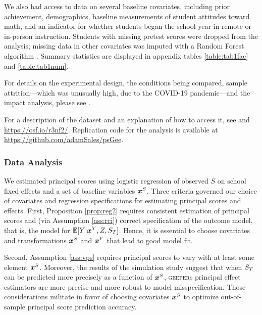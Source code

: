 \documentclass[]{article}
\begin{document}
We also had access to data on several baseline covariates, including prior achievement, demographics, baseline measurements of student attitudes toward math, and an indicator for whether students began the school year in remote or in-person instruction.
Students with missing pretest scores were dropped from the analysis; missing data in other covariates was imputed with a Random Forest algorithm \citep{missForest}. Summary statistics are displayed in appendix tables \ref{table:tab1fac} and \ref{table:tab1num}.

For details on the experimental design, the conditions being compared, sample attrition---which was unusually high, due to the COVID-19 pandemic---and the impact analysis, please see \citet{impactPaper}.

For a description of the dataset and an explanation of how to access it, see \citet{ottmar2023data} and \url{https://osf.io/r3nf2/}.
Replication code for the analysis is available at %
\url{https://github.com/adamSales/psGee}.

\subsubsection{Data Analysis}
We estimated principal scores using logistic regression of observed $S$ on school fixed effects and a set of baseline variables $\bm{x}^S$.
Three criteria governed our choice of covariates and regression specifications for estimating principal scores and effects.
First, Proposition \ref{prop:reg2} requires consistent estimation of principal scores and (via Assumption \ref{ass:rci}) correct specification of the outcome model, that is, the model for $\mathbb{E}[Y|\bm{x}^Y,Z,S_T]$.
Hence, it is essential to choose covariates and transformations $\bm{x}^S$ and $\bm{x}^Y$ that lead to good model fit.

Second, Assumption \ref{ass:vps} requires principal scores to vary with at least some element $\bm{x}^S$. Moreover, the results of the simulation study suggest that when $S_T$ can be predicted more precisely as a function of $\bm{x}^S$, \textsc{geeper}s principal effect estimators are more precise and more robust to model misspecification.
Those considerations militate in favor of choosing covariates $\bm{x}^S$ to optimize out-of-sample principal score prediction accuracy.
\end{document}

